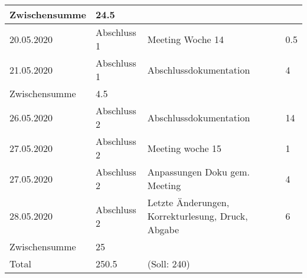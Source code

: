 \documentclass[
	ngerman,
	toc=listof, %
	toc=bibliography, %
	footnotes=multiple, %
	parskip=half, %
	numbers=noendperiod %
]{scrartcl}
\begin{document}
\begin{tabularx}{\textwidth}{llXl}
		Zwischensumme & 24.5 & & \\ 
		\midrule
		20.05.2020 & Abschluss 1 & Meeting Woche 14 & 0.5 \\
		21.05.2020 & Abschluss 1 & Abschlussdokumentation & 4 \\
		\midrule
		Zwischensumme & 4.5 & & \\
		\midrule
		26.05.2020 & Abschluss 2 & Abschlussdokumentation & 14 \\
		27.05.2020 & Abschluss 2 & Meeting woche 15 & 1 \\
		27.05.2020 & Abschluss 2 & Anpassungen Doku gem. Meeting & 4 \\
		28.05.2020 & Abschluss 2 & Letzte Änderungen, Korrekturlesung, Druck, Abgabe & 6 \\
		\midrule 
		Zwischensumme & 25 & & \\
		\midrule
		Total & 250.5 & (Soll: 240) & \\
		\bottomrule
	\end{tabularx}
\end{document}
